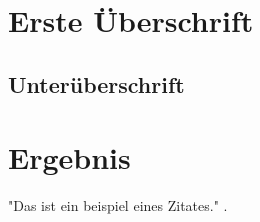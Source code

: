 \documentclass[12pt]{article}
\begin{document}
\doublespacing
\section*{Erste Überschrift}
\lipsum[1-5]

\subsection*{Unterüberschrift}

\lipsum[5-10]

\section*{Ergebnis}
"Das ist ein beispiel eines Zitates." \cite{kr}.

\newpage


\newpage
\thispagestyle{empty} %
\linespread{1}

\end{document}

